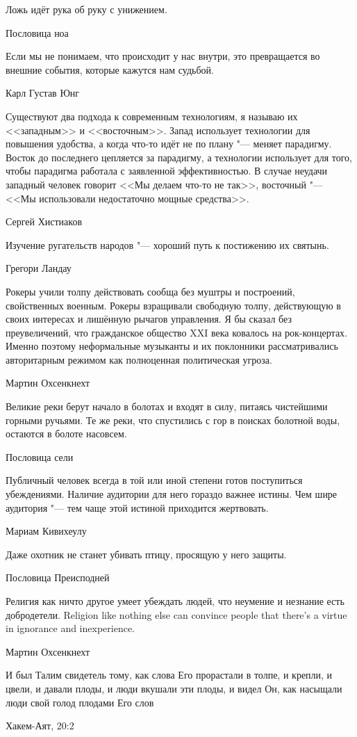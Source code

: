 \epigraph
{Ложь идёт рука об руку с унижением.}
{Пословица ноа}

\epigraph
{Если мы не понимаем, что происходит у нас внутри, это превращается во внешние события, которые кажутся нам судьбой.}
{Карл Густав Юнг}

\epigraph
{Существуют два подхода к современным технологиям, я называю их <<западным>> и <<восточным>>.
Запад использует технологии для повышения удобства, а когда что-то идёт не по плану "--- меняет парадигму.
Восток до последнего цепляется за парадигму, а технологии использует для того, чтобы парадигма работала с заявленной эффективностью.
В случае неудачи западный человек говорит <<Мы делаем что-то не так>>, восточный "--- <<Мы использовали недостаточно мощные средства>>.}
{Сергей Хистиаков}

\epigraph{Изучение ругательств народов "--- хороший путь к постижению их святынь.}
{Грегори Ландау}

\epigraph
{Рокеры учили толпу действовать сообща без муштры и построений, свойственных военным.
Рокеры взращивали свободную толпу, действующую в своих интересах и лишённую рычагов управления.
Я бы сказал без преувеличений, что гражданское общество XXI века ковалось на рок-концертах.
Именно поэтому неформальные музыканты и их поклонники рассматривались авторитарным режимом как полноценная политическая угроза.}
{Мартин Охсенкнехт}

\epigraph
{Великие реки берут начало в болотах и входят в силу, питаясь чистейшими горными ручьями.
Те же реки, что спустились с гор в поисках болотной воды, остаются в болоте насовсем.}
{Пословица сели}

\epigraph
{Публичный человек всегда в той или иной степени готов поступиться убеждениями.
Наличие аудитории для него гораздо важнее истины.
Чем шире аудитория "--- тем чаще этой истиной приходится жертвовать.}
{Мариам Кивихеулу}

\epigraph
{Даже охотник не станет убивать птицу, просящую у него защиты.}
{Пословица Преисподней}

\epigraph{
{Религия как ничто другое умеет убеждать людей, что неумение и незнание есть добродетели.}
{Religion like nothing else can convince people that there's a virtue in ignorance and inexperience.}
}{
Мартин Охсенкнехт
}

\epigraph
{\ldotst И был Талим свидетель тому, как слова Его прорастали в толпе, и крепли, и цвели, и давали плоды, и люди вкушали эти плоды, и видел Он, как насыщали люди свой голод плодами Его слов\ldotst}
{Хакем-Аят, 20:2}

